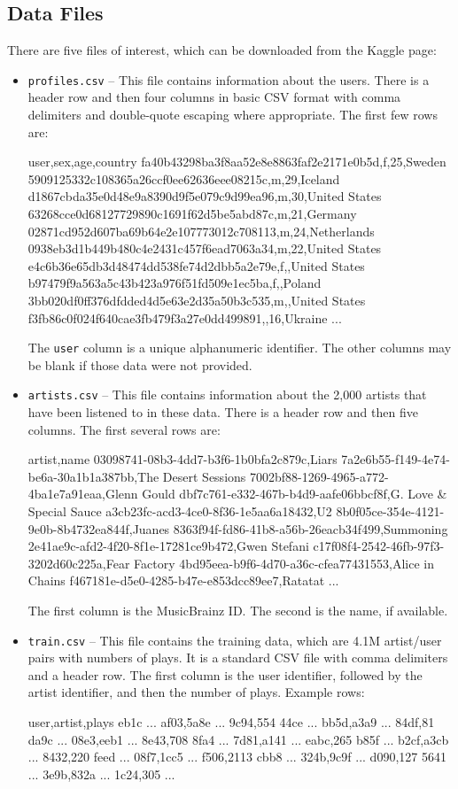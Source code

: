 \documentclass[12pt]{article}
\begin{document}
\subsection*{Data Files}
There are five files of interest, which can be downloaded from the Kaggle page:
\begin{itemize}
\item \verb|profiles.csv| -- This file contains information about the users.  There is a header row and then four columns in basic CSV format with comma delimiters and double-quote escaping where appropriate.  The first few rows are:
\begin{csv}
user,sex,age,country
fa40b43298ba3f8aa52e8e8863faf2e2171e0b5d,f,25,Sweden
5909125332c108365a26ccf0ee62636eee08215c,m,29,Iceland
d1867cbda35e0d48e9a8390d9f5e079c9d99ea96,m,30,United States
63268cce0d68127729890c1691f62d5be5abd87c,m,21,Germany
02871cd952d607ba69b64e2e107773012c708113,m,24,Netherlands
0938eb3d1b449b480c4e2431c457f6ead7063a34,m,22,United States
e4c6b36e65db3d48474dd538fe74d2dbb5a2e79e,f,,United States
b97479f9a563a5c43b423a976f51fd509e1ec5ba,f,,Poland
3bb020df0ff376dfdded4d5e63e2d35a50b3c535,m,,United States
f3fb86c0f024f640cae3fb479f3a27e0dd499891,,16,Ukraine
...
\end{csv}
The \texttt{user} column is a unique alphanumeric identifier.  The other columns may be blank if those data were not provided.

\item \verb|artists.csv| -- This file contains information about the 2,000 artists that have been listened to in these data.  There is a header row and then five columns.  The first several rows are:
\begin{csv}
artist,name
03098741-08b3-4dd7-b3f6-1b0bfa2c879c,Liars
7a2e6b55-f149-4e74-be6a-30a1b1a387bb,The Desert Sessions
7002bf88-1269-4965-a772-4ba1e7a91eaa,Glenn Gould
dbf7c761-e332-467b-b4d9-aafe06bbcf8f,G. Love & Special Sauce
a3cb23fc-acd3-4ce0-8f36-1e5aa6a18432,U2
8b0f05ce-354e-4121-9e0b-8b4732ea844f,Juanes
8363f94f-fd86-41b8-a56b-26eacb34f499,Summoning
2e41ae9c-afd2-4f20-8f1e-17281ce9b472,Gwen Stefani
c17f08f4-2542-46fb-97f3-3202d60c225a,Fear Factory
4bd95eea-b9f6-4d70-a36c-cfea77431553,Alice in Chains
f467181e-d5e0-4285-b47e-e853dcc89ee7,Ratatat
...
\end{csv}
The first column is the MusicBrainz ID.  The second is the name, if available.

\item \verb|train.csv| -- This file contains the training data, which are 4.1M artist/user pairs with numbers of plays.  It is a standard CSV file with comma delimiters and a header row.  The first column is the user identifier, followed by the artist identifier, and then the number of plays.  Example rows:
\begin{csv}
user,artist,plays
eb1c ... af03,5a8e ... 9c94,554
44ce ... bb5d,a3a9 ... 84df,81
da9c ... 08e3,eeb1 ... 8e43,708
8fa4 ... 7d81,a141 ... eabc,265
b85f ... b2cf,a3cb ... 8432,220
feed ... 08f7,1cc5 ... f506,2113
cbb8 ... 324b,9c9f ... d090,127
5641 ... 3e9b,832a ... 1c24,305
...
\end{csv}


\end{itemize}
\end{document}
